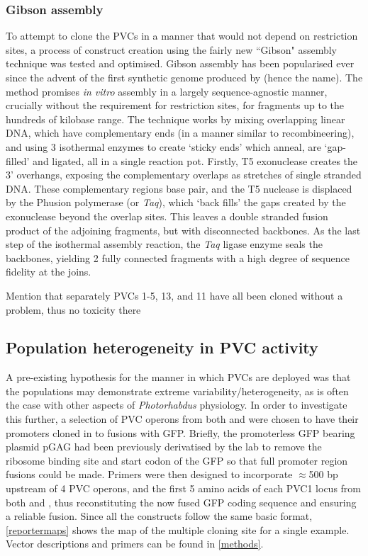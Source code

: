 \subsubsection{Gibson assembly}
To attempt to clone the PVCs in a manner that would not depend on restriction sites, a process of construct creation using the fairly new ``Gibson" assembly technique was tested and optimised. Gibson assembly has been popularised ever since the advent of the first synthetic genome produced by \cite{Gibson2010c, Gibson2009a} (hence the name). The method promises \emph{in vitro} assembly in a largely sequence-agnostic manner, crucially without the requirement for restriction sites, for fragments up to the hundreds of kilobase range. The technique works by mixing overlapping linear DNA, which have complementary ends (in a manner similar to recombineering), and using 3 isothermal enzymes to create `sticky ends' which anneal, are `gap-filled' and ligated, all in a single reaction pot. Firstly, T5 exonuclease creates the 3' overhangs, exposing the complementary overlaps as stretches of single stranded DNA. These complementary regions base pair, and the T5 nuclease is displaced by the Phusion polymerase (or \emph{Taq}), which `back fills' the gaps created by the exonuclease beyond the overlap sites. This leaves a double stranded fusion product of the adjoining fragments, but with disconnected backbones. As the last step of the isothermal assembly reaction, the \emph{Taq} ligase enzyme seals the backbones, yielding 2 fully connected fragments with a high degree of sequence fidelity at the joins.



Mention that separately PVCs 1-5, 13, and 11 have all been cloned without a problem, thus no toxicity there



\subsection{Population heterogeneity in PVC activity}\label{heterogeneity}
A pre-existing hypothesis for the manner in which PVCs are deployed was that the populations may demonstrate extreme variability/heterogeneity, as is often the case with other aspects of \emph{Photorhabdus} physiology. In order to investigate this further, a selection of PVC operons from both \Plum{} and \Pasy{} were chosen to have their promoters cloned in to fusions with GFP. Briefly, the promoterless GFP bearing plasmid pGAG had been previously derivatised by the lab to remove the ribosome binding site and start codon of the GFP so that full promoter region fusions could be made. Primers were then designed to incorporate $\approx$500 bp upstream of 4 PVC operons, and the first 5 amino acids of each PVC1 locus from both \Plum{} and \Pasy, thus reconstituting the now fused GFP coding sequence and ensuring a reliable fusion. Since all the constructs follow the same basic format, \vref{reportermaps} shows the map of the multiple cloning site for a single example. Vector descriptions and primers can be found in \vref{methods}.


